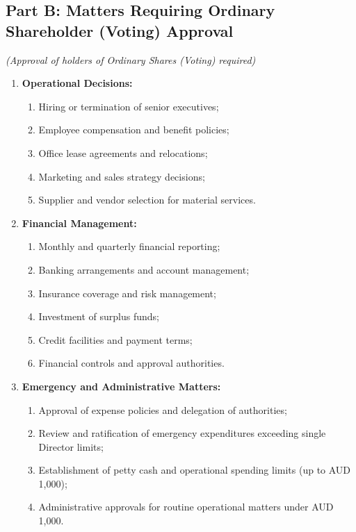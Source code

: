 \subsection*{Part B: Matters Requiring Ordinary Shareholder (Voting) Approval}
\textit{(Approval of holders of Ordinary Shares (Voting) required)}

\begin{enumerate}[label=\arabic*.]
    \item \textbf{Operational Decisions:}
        \begin{enumerate}[label=(\alph*)]
            \item Hiring or termination of senior executives;
            \item Employee compensation and benefit policies;
            \item Office lease agreements and relocations;
            \item Marketing and sales strategy decisions;
            \item Supplier and vendor selection for material services.
        \end{enumerate}

    \item \textbf{Financial Management:}
        \begin{enumerate}[label=(\alph*)]
            \item Monthly and quarterly financial reporting;
            \item Banking arrangements and account management;
            \item Insurance coverage and risk management;
            \item Investment of surplus funds;
            \item Credit facilities and payment terms;
            \item Financial controls and approval authorities.
        \end{enumerate}

    \item \textbf{Emergency and Administrative Matters:}
        \begin{enumerate}[label=(\alph*)]
            \item Approval of expense policies and delegation of authorities;
            \item Review and ratification of emergency expenditures exceeding single Director limits;
            \item Establishment of petty cash and operational spending limits (up to AUD 1,000);
            \item Administrative approvals for routine operational matters under AUD 1,000.
        \end{enumerate}
\end{enumerate}

